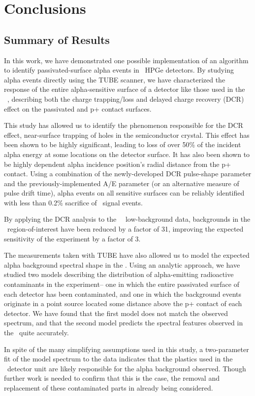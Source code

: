 \chapter{Conclusions}
\section{Summary of Results}
In this work, we have demonstrated one possible implementation of an algorithm to identify passivated-surface alpha events in \ppc\ HPGe detectors. By studying alpha events directly using the TUBE scanner, we have characterized the response of the entire alpha-sensitive surface of a detector like those used in the \MJ\ \DEM, describing both the charge trapping/loss and delayed charge recovery (DCR) effect on the passivated and p+ contact surfaces. 

This study has allowed us to identify the phenomenon responsible for the DCR effect, near-surface trapping of holes in the semiconductor crystal. This effect has been shown to be highly significant, leading to loss of over 50\% of the incident alpha energy at some locations on the detector surface. It has also been shown to be highly dependent alpha incidence position's radial distance from the p+ contact. Using a combination of the newly-developed DCR pulse-shape parameter and the previously-implemented A/E parameter (or an alternative measure of pulse drift time), alpha events on all sensitive surfaces can be reliably identified with less than 0.2\% sacrifice of \nonubb\ signal events. 

By applying the DCR analysis to the \MJ\ \DEM\ low-background data, backgrounds in the \nonubb\ region-of-interest have been reduced by a factor of 31, improving the expected sensitivity of the experiment by a factor of 3. 

The measurements taken with TUBE have also allowed us to model the expected alpha background spectral shape in the \DEM. Using an analytic approach, we have studied two models describing the distribution of alpha-emitting radioactive contaminants in the experiment-- one in which the entire passivated surface of each detector has been contaminated, and one in which the background events originate in a point source located some distance above the p+ contact of each detector. We have found that the first model does not match the observed spectrum, and that the second model predicts the spectral features observed in the \DEM\ quite accurately. 

In spite of the many simplifying assumptions used in this study, a two-parameter fit of the model spectrum to the data indicates that the plastics used in the \MJ\ detector unit are likely responsible for the alpha background observed. Though further work is needed to confirm that this is the case, the removal and replacement of these contaminated parts in already being considered. 
 
